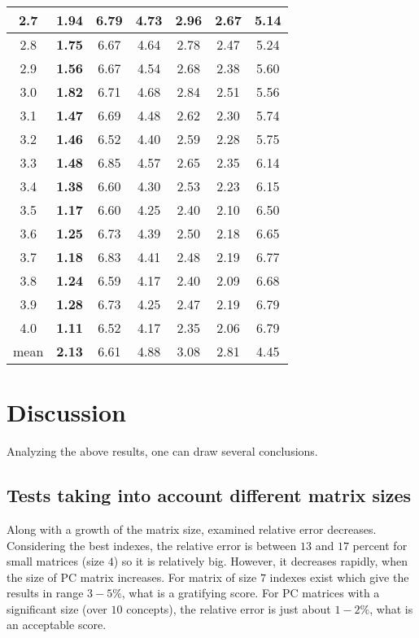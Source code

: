 \begin{table}[h]
\begin{center}
\begin{tabular}{|c||c|c|c|c|c|c|}
2.7 & \textbf{1.94} & 6.79 & 4.73 & 2.96 & 2.67 & 5.14 \\ \hline
2.8 & \textbf{1.75} & 6.67 & 4.64 & 2.78 & 2.47 & 5.24 \\ \hline
2.9 & \textbf{1.56} & 6.67 & 4.54 & 2.68 & 2.38 & 5.60 \\ \hline
3.0 & \textbf{1.82} & 6.71 & 4.68 & 2.84 & 2.51 & 5.56 \\ \hline
3.1 & \textbf{1.47} & 6.69 & 4.48 & 2.62 & 2.30 & 5.74 \\ \hline
3.2 & \textbf{1.46} & 6.52 & 4.40 & 2.59 & 2.28 & 5.75 \\ \hline
3.3 & \textbf{1.48} & 6.85 & 4.57 & 2.65 & 2.35 & 6.14 \\ \hline
3.4 & \textbf{1.38} & 6.60 & 4.30 & 2.53 & 2.23 & 6.15 \\ \hline
3.5 & \textbf{1.17} & 6.60 & 4.25 & 2.40 & 2.10 & 6.50 \\ \hline
3.6 & \textbf{1.25} & 6.73 & 4.39 & 2.50 & 2.18 & 6.65 \\ \hline
3.7 & \textbf{1.18} & 6.83 & 4.41 & 2.48 & 2.19 & 6.77 \\ \hline
3.8 & \textbf{1.24} & 6.59 & 4.17 & 2.40 & 2.09 & 6.68 \\ \hline
3.9 & \textbf{1.28} & 6.73 & 4.25 & 2.47 & 2.19 & 6.79 \\ \hline
4.0 & \textbf{1.11} & 6.52 & 4.17 & 2.35 & 2.06 & 6.79 \\ \hline \hline
mean & \textbf{2.13} & 6.61 & 4.88 & 3.08 & 2.81 & 4.45 \\ \hline 
\end{tabular}
\end{center}
\end{table}



\section{Discussion}
Analyzing the above results, one can draw several conclusions.

\subsection{Tests taking into account different matrix sizes}
Along with a growth of the matrix size, examined relative error decreases. Considering the best indexes, the relative error is between $13$ and $17$ percent for small matrices (size $4$) so it is relatively big. However, it decreases rapidly, when the size of PC matrix increases. For matrix of size $7$ indexes exist which give the results in range $3 - 5 \%$, what is a gratifying score. For PC matrices with a significant size (over $10$ concepts), the relative error is just about $1 - 2 \%$, what is an acceptable score.


